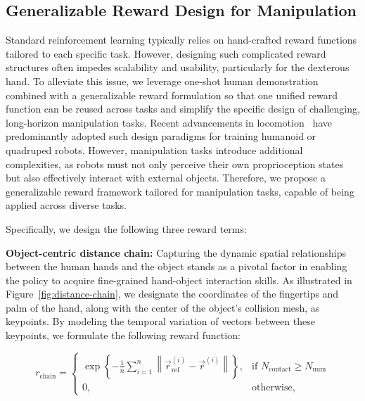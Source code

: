 \subsection{Generalizable Reward Design for Manipulation}
Standard reinforcement learning typically relies on hand-crafted reward functions tailored to each specific task. However, designing such complicated reward structures often impedes scalability and usability, particularly for the dexterous hand. To alleviate this issue, we leverage one-shot human demonstration combined with a generalizable reward formulation so that one unified reward function can be reused across tasks and simplify the specific design of challenging, long-horizon manipulation tasks. Recent advancements in locomotion~\cite{luo2023perpetual,peng2018deepmimic,he2025asap,allshire2025visual} have predominantly adopted such design paradigms for training humanoid or quadruped robots. However, manipulation tasks introduce additional complexities, as robots must not only perceive their own proprioception states but also effectively interact with external objects. Therefore, we propose a generalizable reward framework tailored for manipulation tasks, capable of being applied across diverse tasks. 

Specifically, we design the following three reward terms:


\textbf{Object-centric distance chain:}  
Capturing the dynamic spatial relationships between the human hands and the object stands as a pivotal factor in enabling the policy to acquire fine-grained hand-object interaction skills. As illustrated in Figure~\ref{fig:distance-chain}, we designate the coordinates of the fingertips and palm of the hand, along with  the center of the object's collision mesh, as keypoints. By modeling the temporal variation of vectors between these keypoints, we formulate the following reward function:

\begin{equation}
r_{\text{chain}} =
\begin{cases}
\exp\left\{- \frac{1}{n} \sum_{i=1}^n \left\| \vec{r}_{\text{ref}}^{(i)} - \vec{r}^{(i)} \right\| \right\}, & \text{if } N_{\text{contact}} \geq N_{\text{num}} \\
0, & \text{otherwise},
\end{cases}
\end{equation}


